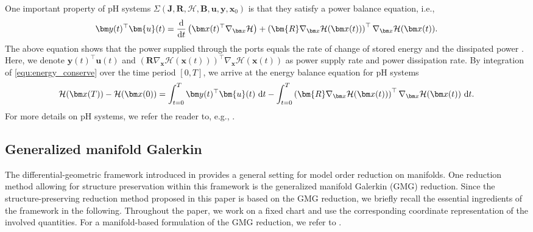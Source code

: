 \documentclass{article}
\newcommand{\curlyH}{\mathcal{H}}
\newcommand{\statex}{{\bm x}}
\newcommand{\outputy}{{\bm y}}
\newcommand{\statexT}{\statex(t)}
\newcommand{\outputyT}{\outputy(t)}
\newcommand{\inputu}{\bm{u}}
\newcommand{\ddt}{\frac{\rm d}{{\rm d} t}}
\newcommand{\SysLable}{\Sigma}
\newcommand{\funcJ}{\bm{J}}
\newcommand{\funcR}{\bm{R}}
\newcommand{\funcB}{\bm{B}}
\newcommand{\pH}{\textsf{pH}\xspace}
\newcommand{\GMG}{\textsf{GMG}\xspace}
\begin{document}
	One important property of \pH systems $\SysLable(\funcJ,\funcR,\curlyH,\funcB, \inputu,\outputy,\statex_0)$ is that they satisfy a power balance equation, i.e., 
	\begin{align}
		\label{equ:energy_conserve}
		\outputyT^{\top}\inputu(t)
		=\ddt \left(\statexT^{\top} \nabla_{\statex}\curlyH\right)+
		\left(\funcR\nabla_{\statex}\curlyH(\statexT)\right)^{\top}\nabla_{\statex}\curlyH(\statexT).
	\end{align}
	The above equation shows that the power supplied through the ports equals the rate of change of stored energy and the dissipated power \cite{polyuga2012effort}. Here, we denote $\outputyT^{\top}\inputu(t)$ and $(\funcR\nabla_{\statex}\curlyH(\statexT))^{\top}\nabla_{\statex}\curlyH(\statexT)$ as power supply rate and power dissipation rate. By integration of \eqref{equ:energy_conserve} over the time period $[0,T]$, we arrive at the energy balance equation for \pH systems
	\begin{align}
		\label{equ:energy_conserve_time_int}
		\curlyH(\statex(T))-\curlyH(\statex(0))
		=
		{\int_{t=0}^{T}\outputyT^{\top}\inputu(t) \ {\rm d}t}
		-
			\int_{t=0}^{T}\left(\funcR\nabla_{\statex}\curlyH(\statexT)\right)^{\top}\nabla_{\statex}\curlyH(\statexT) \ {\rm d}t.
	\end{align}	
	For more details on \pH systems, we refer the reader to, e.g., \cite{jacob2012linear, vanderschaft2014port, rashad2020,mehrmann2023control}.
	
	
	
	\subsection{Generalized manifold Galerkin}
	\label{subsec:gmg_recall}
The differential-geometric framework introduced in \cite{buchfink2024model} provides a general setting for model order reduction on manifolds. One reduction method allowing for structure preservation within this framework is the generalized manifold Galerkin (\GMG) reduction. Since the structure-preserving reduction method proposed in this paper is based on the \GMG reduction, we briefly recall the essential ingredients of the framework in the following. Throughout the paper, we work on a fixed chart and use the corresponding coordinate representation of the involved quantities. For a manifold-based formulation of the \GMG reduction, we refer to \cite[Section 5]{buchfink2024model}. 
	
\end{document}
